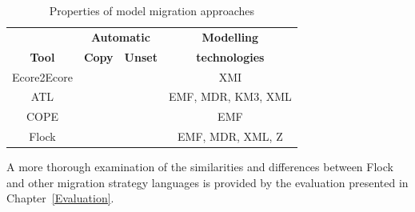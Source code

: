 \begin{table}[b]
	\centering
	\begin{tabular}{|c|c|c|c|}
		\hline
		             & \multicolumn{2}{c|}{\textbf{Automatic}} & \textbf{Modelling} \\
		\textbf{Tool}& \textbf{Copy} & \textbf{Unset}          & \textbf{technologies} \\
		\hline
		Ecore2Ecore  & \tick             & \cross              & XMI                    \\
		\hline
		ATL          & \cross            & \tick               & EMF, MDR, KM3, XML     \\
		\hline
		COPE         & \tick             & \cross              & EMF                    \\
		\hline
		Flock        & \tick             & \tick               & EMF, MDR, XML, Z       \\
		\hline
	\end{tabular}
	\label{tab:differences}
	\caption{Properties of model migration approaches}
\end{table}

A more thorough examination of the similarities and differences between Flock and other migration strategy languages is provided by the evaluation presented in Chapter~\ref{Evaluation}.
